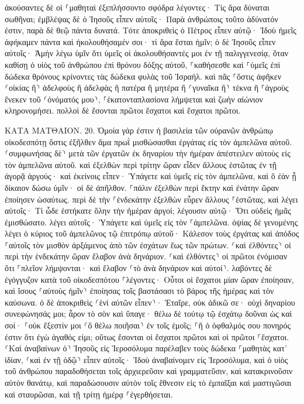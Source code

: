 \documentclass[twoside, 9pt]{extreport}
\begin{document}
ἀκούσαντες δὲ οἱ ⸀μαθηταὶ ἐξεπλήσσοντο σφόδρα λέγοντες· Τίς ἄρα δύναται σωθῆναι; 
ἐμβλέψας δὲ ὁ Ἰησοῦς εἶπεν αὐτοῖς· Παρὰ ἀνθρώποις τοῦτο ἀδύνατόν ἐστιν, παρὰ δὲ θεῷ πάντα δυνατά. 
Τότε ἀποκριθεὶς ὁ Πέτρος εἶπεν αὐτῷ· Ἰδοὺ ἡμεῖς ἀφήκαμεν πάντα καὶ ἠκολουθήσαμέν σοι· τί ἄρα ἔσται ἡμῖν; 
ὁ δὲ Ἰησοῦς εἶπεν αὐτοῖς· Ἀμὴν λέγω ὑμῖν ὅτι ὑμεῖς οἱ ἀκολουθήσαντές μοι ἐν τῇ παλιγγενεσίᾳ, ὅταν καθίσῃ ὁ υἱὸς τοῦ ἀνθρώπου ἐπὶ θρόνου δόξης αὐτοῦ, ⸀καθήσεσθε καὶ ⸀ὑμεῖς ἐπὶ δώδεκα θρόνους κρίνοντες τὰς δώδεκα φυλὰς τοῦ Ἰσραήλ. 
καὶ πᾶς ⸀ὅστις ἀφῆκεν ⸂οἰκίας ἢ⸃ ἀδελφοὺς ἢ ἀδελφὰς ἢ πατέρα ἢ μητέρα ἢ ⸂γυναῖκα ἢ⸃ τέκνα ἢ ⸀ἀγροὺς ἕνεκεν τοῦ ⸂ὀνόματός μου⸃, ⸀ἑκατονταπλασίονα λήμψεται καὶ ζωὴν αἰώνιον κληρονομήσει. 
πολλοὶ δὲ ἔσονται πρῶτοι ἔσχατοι καὶ ἔσχατοι πρῶτοι. 

ΚΑΤΑ ΜΑΤΘΑΙΟΝ.
20.
Ὁμοία γάρ ἐστιν ἡ βασιλεία τῶν οὐρανῶν ἀνθρώπῳ οἰκοδεσπότῃ ὅστις ἐξῆλθεν ἅμα πρωῒ μισθώσασθαι ἐργάτας εἰς τὸν ἀμπελῶνα αὐτοῦ. 
⸂συμφωνήσας δὲ⸃ μετὰ τῶν ἐργατῶν ἐκ δηναρίου τὴν ἡμέραν ἀπέστειλεν αὐτοὺς εἰς τὸν ἀμπελῶνα αὐτοῦ. 
καὶ ἐξελθὼν περὶ τρίτην ὥραν εἶδεν ἄλλους ἑστῶτας ἐν τῇ ἀγορᾷ ἀργούς· 
καὶ ἐκείνοις εἶπεν· Ὑπάγετε καὶ ὑμεῖς εἰς τὸν ἀμπελῶνα, καὶ ὃ ἐὰν ᾖ δίκαιον δώσω ὑμῖν· 
οἱ δὲ ἀπῆλθον. ⸀πάλιν ἐξελθὼν περὶ ἕκτην καὶ ἐνάτην ὥραν ἐποίησεν ὡσαύτως. 
περὶ δὲ τὴν ⸀ἑνδεκάτην ἐξελθὼν εὗρεν ἄλλους ⸀ἑστῶτας, καὶ λέγει αὐτοῖς· Τί ὧδε ἑστήκατε ὅλην τὴν ἡμέραν ἀργοί; 
λέγουσιν αὐτῷ· Ὅτι οὐδεὶς ἡμᾶς ἐμισθώσατο. λέγει αὐτοῖς· Ὑπάγετε καὶ ὑμεῖς εἰς τὸν ⸀ἀμπελῶνα. 
ὀψίας δὲ γενομένης λέγει ὁ κύριος τοῦ ἀμπελῶνος τῷ ἐπιτρόπῳ αὐτοῦ· Κάλεσον τοὺς ἐργάτας καὶ ἀπόδος ⸀αὐτοῖς τὸν μισθὸν ἀρξάμενος ἀπὸ τῶν ἐσχάτων ἕως τῶν πρώτων. 
⸂καὶ ἐλθόντες⸃ οἱ περὶ τὴν ἑνδεκάτην ὥραν ἔλαβον ἀνὰ δηνάριον. 
⸂καὶ ἐλθόντες⸃ οἱ πρῶτοι ἐνόμισαν ὅτι ⸀πλεῖον λήμψονται· καὶ ἔλαβον ⸂τὸ ἀνὰ δηνάριον καὶ αὐτοί⸃. 
λαβόντες δὲ ἐγόγγυζον κατὰ τοῦ οἰκοδεσπότου 
⸀λέγοντες· Οὗτοι οἱ ἔσχατοι μίαν ὥραν ἐποίησαν, καὶ ἴσους ⸂αὐτοὺς ἡμῖν⸃ ἐποίησας τοῖς βαστάσασι τὸ βάρος τῆς ἡμέρας καὶ τὸν καύσωνα. 
ὁ δὲ ἀποκριθεὶς ⸂ἑνὶ αὐτῶν εἶπεν⸃· Ἑταῖρε, οὐκ ἀδικῶ σε· οὐχὶ δηναρίου συνεφώνησάς μοι; 
ἆρον τὸ σὸν καὶ ὕπαγε· θέλω δὲ τούτῳ τῷ ἐσχάτῳ δοῦναι ὡς καὶ σοί· 
⸀οὐκ ἔξεστίν μοι ⸂ὃ θέλω ποιῆσαι⸃ ἐν τοῖς ἐμοῖς; ⸀ἢ ὁ ὀφθαλμός σου πονηρός ἐστιν ὅτι ἐγὼ ἀγαθός εἰμι; 
οὕτως ἔσονται οἱ ἔσχατοι πρῶτοι καὶ οἱ πρῶτοι ⸀ἔσχατοι. 
⸂Καὶ ἀναβαίνων ὁ⸃ Ἰησοῦς εἰς Ἱεροσόλυμα παρέλαβεν τοὺς δώδεκα ⸀μαθητὰς κατ᾽ ἰδίαν, ⸂καὶ ἐν τῇ ὁδῷ⸃ εἶπεν αὐτοῖς· 
Ἰδοὺ ἀναβαίνομεν εἰς Ἱεροσόλυμα, καὶ ὁ υἱὸς τοῦ ἀνθρώπου παραδοθήσεται τοῖς ἀρχιερεῦσιν καὶ γραμματεῦσιν, καὶ κατακρινοῦσιν αὐτὸν θανάτῳ, 
καὶ παραδώσουσιν αὐτὸν τοῖς ἔθνεσιν εἰς τὸ ἐμπαῖξαι καὶ μαστιγῶσαι καὶ σταυρῶσαι, καὶ τῇ τρίτῃ ἡμέρᾳ ⸀ἐγερθήσεται. 
\end{document}
